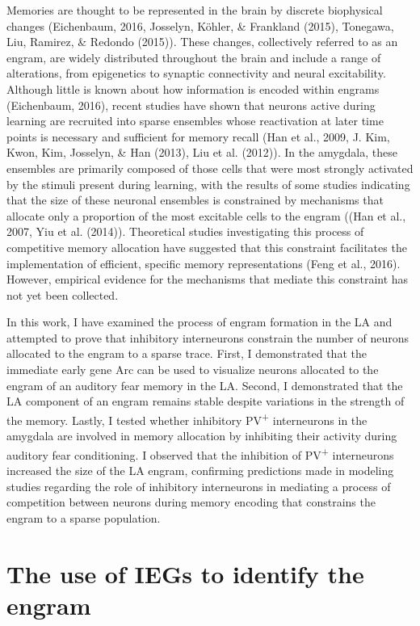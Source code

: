 \documentclass[12pt,a4paperpaper,]{report}
\begin{document}
Memories are thought to be represented in the brain by discrete
biophysical changes (Eichenbaum, 2016, Josselyn, Köhler, \& Frankland
(2015), Tonegawa, Liu, Ramirez, \& Redondo (2015)). These changes,
collectively referred to as an engram, are widely distributed throughout
the brain and include a range of alterations, from epigenetics to
synaptic connectivity and neural excitability. Although little is known
about how information is encoded within engrams (Eichenbaum, 2016),
recent studies have shown that neurons active during learning are
recruited into sparse ensembles whose reactivation at later time points
is necessary and sufficient for memory recall (Han et al., 2009, J. Kim,
Kwon, Kim, Josselyn, \& Han (2013), Liu et al. (2012)). In the amygdala,
these ensembles are primarily composed of those cells that were most
strongly activated by the stimuli present during learning, with the
results of some studies indicating that the size of these neuronal
ensembles is constrained by mechanisms that allocate only a proportion
of the most excitable cells to the engram ((Han et al., 2007, Yiu et al.
(2014)). Theoretical studies investigating this process of competitive
memory allocation have suggested that this constraint facilitates the
implementation of efficient, specific memory representations (Feng et
al., 2016). However, empirical evidence for the mechanisms that mediate
this constraint has not yet been collected.

In this work, I have examined the process of engram formation in the LA
and attempted to prove that inhibitory interneurons constrain the number
of neurons allocated to the engram to a sparse trace. First, I
demonstrated that the immediate early gene Arc can be used to visualize
neurons allocated to the engram of an auditory fear memory in the LA.
Second, I demonstrated that the LA component of an engram remains stable
despite variations in the strength of the memory. Lastly, I tested
whether inhibitory PV\textsuperscript{+} interneurons in the amygdala
are involved in memory allocation by inhibiting their activity during
auditory fear conditioning. I observed that the inhibition of
PV\textsuperscript{+} interneurons increased the size of the LA engram,
confirming predictions made in modeling studies regarding the role of
inhibitory interneurons in mediating a process of competition between
neurons during memory encoding that constrains the engram to a sparse
population.

\section{The use of IEGs to identify the
engram}\label{the-use-of-iegs-to-identify-the-engram}
\end{document}

